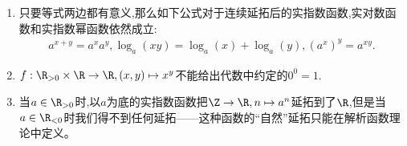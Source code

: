 \begin{remark}{}{}
	\begin{enumerate}
		\item 只要等式两边都有意义,那么如下公式对于连续延拓后的实指数函数,实对数函数和实指数幂函数依然成立:
		\begin{align*}
			a^{x+y}=a^{x}a^{y},\log_{a}\left(xy\right)=\log_{a}\left(x\right)+\log_{a}\left(y\right),\left(a^{x}\right)^{y}=a^{xy}.
		\end{align*}
		\item $f:\R_{>0}\times\R\to\R,\left(x,y\right)\mapsto x^{y}$不能给出代数中约定的$0^0=1$.
		\item 当$a\in\R_{>0}$时,以$a$为底的实指数函数把$\Z\to\R,n\mapsto a^{n}$延拓到了$\R$,但是当$a\in\R_{<0}$时我们得不到任何延拓——这种函数的``自然''延拓只能在解析函数理论中定义。
	\end{enumerate}
\end{remark}